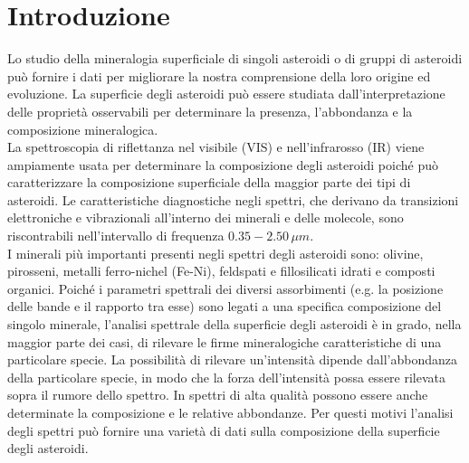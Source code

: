 \section{Introduzione}
Lo studio della mineralogia superficiale di singoli asteroidi o di gruppi di asteroidi può fornire i dati per migliorare la nostra comprensione della loro origine ed evoluzione. La superficie degli asteroidi può essere studiata dall'interpretazione delle proprietà osservabili per determinare la presenza, l'abbondanza e la composizione mineralogica.\\
La spettroscopia di riflettanza nel visibile (VIS) e nell'infrarosso (IR) viene ampiamente usata per determinare la composizione degli asteroidi poiché può caratterizzare la composizione superficiale della maggior parte dei tipi di asteroidi. Le caratteristiche diagnostiche negli spettri, che derivano da transizioni elettroniche e vibrazionali all'interno dei minerali e delle molecole, sono riscontrabili nell'intervallo di frequenza $0.35-2.50\,\mu m$.\\
I minerali più importanti presenti negli spettri degli asteroidi sono: olivine, pirosseni, metalli ferro-nichel (Fe-Ni), feldspati e fillosilicati idrati e composti organici. Poiché i parametri spettrali dei diversi assorbimenti (e.g. la posizione delle bande e il rapporto tra esse) sono legati a una specifica composizione del singolo minerale, l'analisi spettrale della superficie degli asteroidi è in grado, nella maggior parte dei casi, di rilevare le firme mineralogiche caratteristiche di una particolare specie. La possibilità di rilevare un'intensità dipende dall'abbondanza della particolare specie, in modo che la forza dell'intensità possa essere rilevata sopra il rumore dello spettro. In spettri di alta qualità possono essere anche determinate la composizione e le relative abbondanze. Per questi motivi l'analisi degli spettri può fornire una varietà di dati sulla composizione della superficie degli asteroidi.\\
